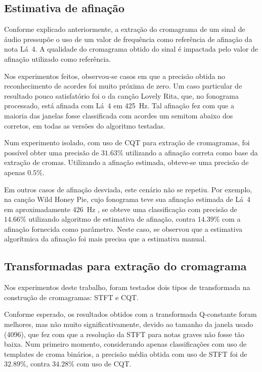     \subsection{Estimativa de afinação}
    
        Conforme explicado anteriormente, a extração do cromagrama de um sinal de áudio pressupõe o uso de um valor de frequência como referência de afinação da nota Lá~4. A qualidade do cromagrama obtido do sinal é impactada pelo valor de afinação utilizado como referência.
        
        Nos experimentos feitos, observou-se casos em que a precisão obtida no reconhecimento de acordes foi muito próxima de zero. Um caso particular de resultado pouco satisfatório foi o da canção Lovely Rita, que, no fonograma processado, está afinada com Lá~4 em 425~Hz.
        Tal afinação fez com que a maioria das janelas fosse classificada com acordes um semitom abaixo dos corretos, em todas as versões do algoritmo testadas.
        
        Num experimento isolado, com uso de CQT para extração de cromagramas, foi possível obter uma precisão de ${31.63}\%$ utilizando a afinação correta como base da extração de cromas. Utilizando a afinação estimada, obteve-se uma precisão de apenas ${0.5}\%$.
        
        Em outros casos de afinação desviada, este cenário não se repetiu. Por exemplo, na canção Wild Honey Pie, cujo fonograma teve sua afinação estimada de Lá~4 em aproximadamente 426~Hz \citep[ver][tabela 9.8]{harte}, se obteve uma classificação com precisão de ${14.66}\%$ utilizando algoritmo de estimativa de afinação, contra ${14.39}\%$ com a afinação fornecida como parâmetro. Neste caso, se observou que a estimativa algorítmica da afinação foi mais precisa que a estimativa manual.
    
    \subsection{Transformadas para extração do cromagrama}
    
        Nos experimentos deste trabalho, foram testados dois tipos de transformada na construção de cromagramas: STFT e CQT.
        
        Conforme esperado, os resultados obtidos com a transformada Q-constante foram melhores, mas não muito significativamente, devido ao tamanho da janela usado (4096), que fez com que a resolução da STFT para notas graves não fosse tão baixa. Num primeiro momento, considerando apenas classificações com uso de templates de croma binários, a precisão média obtida com uso de STFT foi de ${32.89}\%$, contra ${34.28}\%$ com uso de CQT.
        
